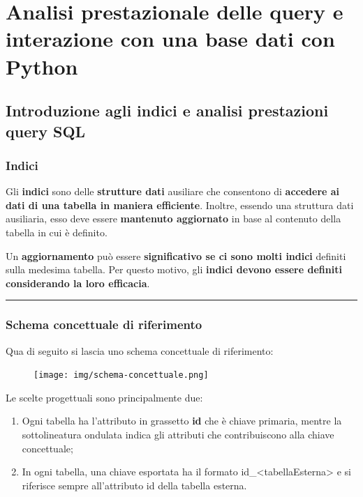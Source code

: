 \documentclass[a4paper]{article}
\newcommand{\longline}{\noindent\rule{\textwidth}{0.4pt}}
\begin{document}
	\section{Analisi prestazionale delle query e interazione con una base dati con Python}
	
	\subsection{Introduzione agli indici e analisi prestazioni query SQL}
	
	\subsubsection{Indici}
	
	Gli \textcolor{Red3}{\textbf{indici}} sono delle \textbf{strutture dati} ausiliare che consentono di \textbf{accedere ai dati di una tabella in maniera efficiente}. Inoltre, essendo una struttura dati ausiliaria, esso deve essere \textbf{mantenuto aggiornato} in base al contenuto della tabella in cui è definito.\newline
	
	\noindent
	Un \textbf{aggiornamento} può essere \textbf{significativo se ci sono molti indici} definiti sulla medesima tabella. Per questo motivo, gli \textbf{indici devono essere definiti considerando la loro efficacia}.
	
	\longline
	
	\subsubsection{Schema concettuale di riferimento}
	
	Qua di seguito si lascia uno schema concettuale di riferimento:
	\begin{figure}[!htp]
		\centering
		\texttt{[image: img/schema-concettuale.png]}
	\end{figure}
	
	\noindent
	Le scelte progettuali sono principalmente due:
	\begin{enumerate}
		\item Ogni tabella ha l'attributo in grassetto \textsf{\textbf{id}} che è chiave primaria, mentre la sottolineatura ondulata indica gli attributi che contribuiscono alla chiave concettuale;
		
		\item In ogni tabella, una chiave esportata ha il formato \textsf{id\_<tabellaEsterna>} e si riferisce sempre all'attributo \textsf{id} della tabella esterna.
	\end{enumerate}\newpage
	
\end{document}
